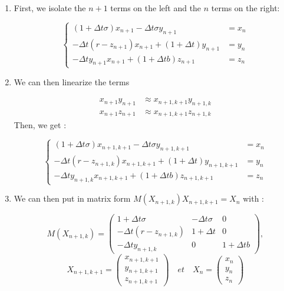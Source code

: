 \documentclass[12pt]{article}
\begin{document}
	\begin{enumerate}[label=\textbullet]
		\item First, we isolate the $n+1$ terms on the left and the $n$ terms on the right:
		
		$$\left\{\begin{aligned} 
			(1+\Delta t\sigma)x_{n+1}-\Delta t\sigma y_{n+1}&=x_n \\
			-\Delta t(r-z_{n+1})x_{n+1}+(1+\Delta t)y_{n+1}&=y_n \\
			-\Delta ty_{n+1}x_{n+1}+(1+\Delta tb)z_{n+1}&=z_n
		\end{aligned}\right.$$
		
		\item We can then linearize the terms 
		
		$$\begin{aligned}
			x_{n+1}y_{n+1}&\approx x_{n+1,k+1}y_{n+1,k} \\
			x_{n+1}z_{n+1}&\approx x_{n+1,k+1}z_{n+1,k}
		\end{aligned}$$ 		
		\noindent Then, we get :
		
		$$\left\{\begin{aligned} 
			(1+\Delta t\sigma)x_{n+1,k+1}-\Delta t\sigma y_{n+1,k+1}&=x_n \\
			-\Delta t(r-z_{n+1,k})x_{n+1,k+1}+(1+\Delta t)y_{n+1,k+1}&=y_n \\
			-\Delta ty_{n+1,k}x_{n+1,k+1}+(1+\Delta tb)z_{n+1,k+1}&=z_n
		\end{aligned}\right.$$
		
		\item We can then put in matrix form  $M(X_{n+1,k})X_{n+1,k+1}=X_n$ with :
		
		$$M(X_{n+1,k})=\begin{pmatrix}
			1+\Delta t\sigma & -\Delta t\sigma & 0 \\
			-\Delta t(r-z_{n+1,k}) & 1+\Delta t & 0 \\
			-\Delta ty_{n+1,k} & 0 & 1+\Delta tb
		\end{pmatrix},$$
		$$X_{n+1,k+1}=\begin{pmatrix}
			x_{n+1,k+1} \\
			y_{n+1,k+1} \\
			z_{n+1,k+1}
		\end{pmatrix} \quad et \quad X_n=\begin{pmatrix}
			x_n \\
			y_n \\
			z_n
		\end{pmatrix} $$
	\end{enumerate}
\end{document}
